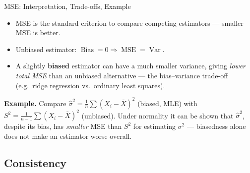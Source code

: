 \documentclass[11pt,aspectratio=169]{beamer}
\newcommand{\Var}{\operatorname{Var}}
\newcommand{\Bias}{\operatorname{Bias}}
\newcommand{\MSE}{\operatorname{MSE}}
\newcommand{\Xbar}{\bar{X}}
\newcommand{\Ex}[1]{\textbf{Example.} #1}
\begin{document}
\begin{frame}{MSE: Interpretation, Trade-offs, Example}
\begin{itemize}
    \item MSE is the standard criterion to compare competing estimators —
          smaller MSE is better.
    \item Unbiased estimator: $\Bias=0 \Rightarrow \MSE=\Var$.
    \item A slightly \textbf{biased} estimator can have a much smaller
          variance, giving \emph{lower total MSE} than an unbiased
          alternative — the bias--variance trade-off (e.g.\ ridge
          regression vs.\ ordinary least squares).
\end{itemize}
\Ex{Compare $\hat\sigma^2=\frac1n\sum(X_i-\Xbar)^2$ (biased, MLE) with
$S^2=\frac{1}{n-1}\sum(X_i-\Xbar)^2$ (unbiased). Under normality it can be
shown that $\hat\sigma^2$, despite its bias, has \emph{smaller} MSE than
$S^2$ for estimating $\sigma^2$ — biasedness alone does not make an
estimator worse overall.}
\end{frame}

\subsection{Consistency}
\end{document}
